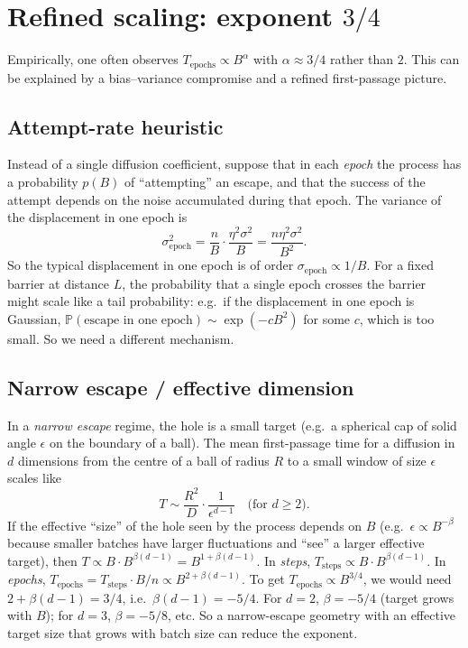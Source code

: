 \documentclass[11pt]{article}
\newcommand{\P}{\mathbb{P}}
\begin{document}
\section{Refined scaling: exponent $3/4$}

Empirically, one often observes $T_{\mathrm{epochs}} \propto B^\alpha$ with $\alpha \approx 3/4$ rather than $2$. This can be explained by a bias--variance compromise and a refined first-passage picture.

\subsection{Attempt-rate heuristic}

Instead of a single diffusion coefficient, suppose that in each \emph{epoch} the process has a probability $p(B)$ of ``attempting'' an escape, and that the success of the attempt depends on the noise accumulated during that epoch. The variance of the displacement in one epoch is
\begin{equation}
\sigma^2_{\mathrm{epoch}} = \frac{n}{B} \cdot \frac{\eta^2 \sigma^2}{B} = \frac{n \eta^2 \sigma^2}{B^2}.
\end{equation}
So the typical displacement in one epoch is of order $\sigma_{\mathrm{epoch}} \propto 1/B$. For a fixed barrier at distance $L$, the probability that a single epoch crosses the barrier might scale like a tail probability: e.g.\ if the displacement in one epoch is Gaussian, $\P(\text{escape in one epoch}) \sim \exp(- c B^2)$ for some $c$, which is too small. So we need a different mechanism.

\subsection{Narrow escape / effective dimension}

In a \emph{narrow escape} regime, the hole is a small target (e.g.\ a spherical cap of solid angle $\epsilon$ on the boundary of a ball). The mean first-passage time for a diffusion in $d$ dimensions from the centre of a ball of radius $R$ to a small window of size $\epsilon$ scales like
\begin{equation}
T \sim \frac{R^2}{D} \cdot \frac{1}{\epsilon^{d-1}} \quad \text{(for $d \geq 2$)}.
\end{equation}
If the effective ``size'' of the hole seen by the process depends on $B$ (e.g.\ $\epsilon \propto B^{-\beta}$ because smaller batches have larger fluctuations and ``see'' a larger effective target), then $T \propto B \cdot B^{\beta(d-1)} = B^{1 + \beta(d-1)}$. In \emph{steps}, $T_{\mathrm{steps}} \propto B \cdot B^{\beta(d-1)}$. In \emph{epochs}, $T_{\mathrm{epochs}} = T_{\mathrm{steps}} \cdot B / n \propto B^{2 + \beta(d-1)}$. To get $T_{\mathrm{epochs}} \propto B^{3/4}$, we would need $2 + \beta(d-1) = 3/4$, i.e.\ $\beta(d-1) = -5/4$. For $d=2$, $\beta = -5/4$ (target grows with $B$); for $d=3$, $\beta = -5/8$, etc. So a narrow-escape geometry with an effective target size that grows with batch size can reduce the exponent.
\end{document}
